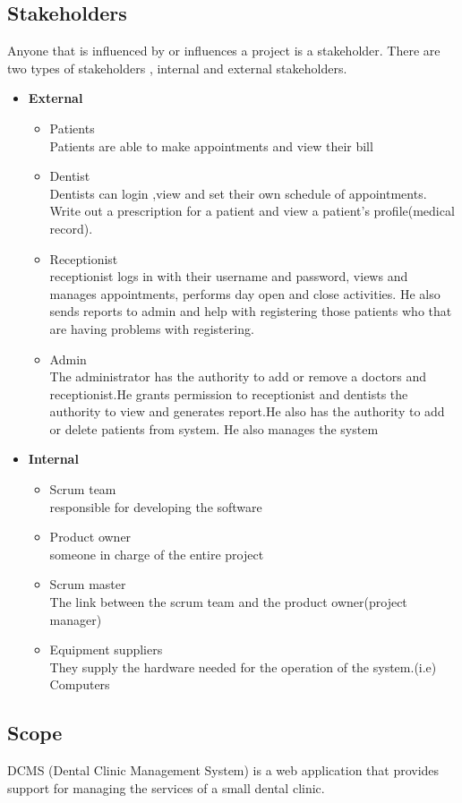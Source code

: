 \documentclass[11 pt]{article}
\begin{document}
\subsection{Stakeholders}
Anyone that is influenced by or influences a project is a stakeholder. There are two types of stakeholders , internal and external stakeholders.
\begin{itemize}
\item \textbf{External}
\begin{itemize}
\item Patients\\
Patients are able to make appointments and view their bill 
\item Dentist\\
Dentists can login ,view and set their own schedule of appointments. Write      out a prescription for a patient and view a patient's profile(medical record).
\item Receptionist\\
receptionist logs in with their username and password, views and manages  appointments, performs day open and close activities. He also sends reports to admin and help with registering those patients who that are having problems with registering.
\item Admin \\
The administrator has the authority to add or remove a doctors and receptionist.He grants permission to receptionist  and  dentists the authority to view and generates report.He also has the authority to add or delete patients from system. He also manages the system
\end{itemize}
\item \textbf{Internal}
\begin{itemize}
\item  Scrum team \\
responsible for developing the software
\item Product owner\\
someone in charge of the entire project
\item Scrum master \\
 The link between the scrum team and the product owner(project manager)
\item Equipment suppliers \\
They supply the hardware needed for the operation of the system.(i.e) Computers
\end{itemize}
\end{itemize}
\subsection{Scope}
DCMS (Dental Clinic Management System) is a web application that provides support for managing the services of a small dental clinic.
\end{document}
